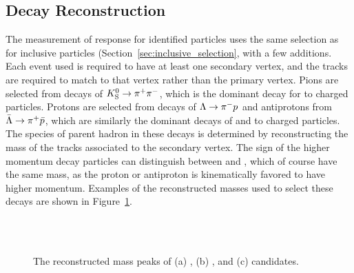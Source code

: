 \subsection{Decay Reconstruction}
The measurement of response for identified particles uses the same selection as for inclusive particles (Section~\ref{sec:inclusive_selection}, with a few additions.
Each event used is required to have at least one secondary vertex, and the tracks are required to match to that vertex rather than the primary vertex.
Pions are selected from decays of $K_\text{S}^{0} \rightarrow \pi^+ \pi^-$, which is the dominant decay for \pKS to charged particles.
Protons are selected from decays of $\Lambda \rightarrow \pi^- p$ and antiprotons from $\bar{\Lambda} \rightarrow \pi^+ \bar{p}$, which are similarly the dominant decays of \pL and \pLB to charged particles.
The species of parent hadron in these decays is determined by reconstructing the mass of the tracks associated to the secondary vertex.
The sign of the higher momentum decay particles can distinguish between \pL and \pLB, which of course have the same mass, as the proton or antiproton is kinematically favored to have higher momentum.
Examples of the reconstructed masses used to select these decays are shown in Figure~\ref{fig:identified_mass}. 

\begin{figure}[htbp]
\centering
{}
\\
~
\caption{The reconstructed mass peaks of (a) \pKS, (b) \pL, and (c) \pLB candidates.}
\label{fig:identified_mass}
\end{figure}

